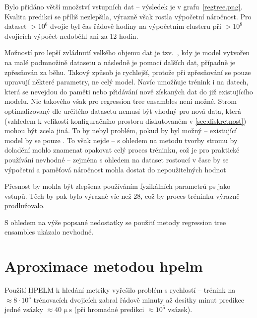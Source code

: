 Bylo přidáno větší množství vstupních dat -- výsledek je v grafu~\ref{regtree.png}. Kvalita predikcí se příliš nezlepšila, výrazně však rostla výpočetní 
náročnost. Pro dataset $>10^6$ dvojic byl čas řádově hodiny na výpočetním clusteru při $>10^8$ dvojicích výpočet 
nedoběhl ani za 12 hodin. 
% 
% 


Možností pro lepší zvládnutí velkého objemu dat je tzv.~, kdy je model vytvořen na malé podmnožině datasetu a následně je 
pomocí dalších dat, případně je zpřesňován za běhu. Takový způsob je rychlejší, protože při zpřesňování se pouze upravují některé parametry, ne 
celý model. Navíc umožňuje trénink i na datech, která se nevejdou do paměti nebo přidávání nově získaných dat do již existujícího modelu. 
Nic takového však pro regression tree ensambles není možné. 
Strom optimalizovaný dle určitého datasetu nemusí být vhodný pro nová data, která (vzhledem k velikosti 
konfiguračního prostoru diskutovaném v \ref{sec:diskretnost}) mohou být zcela jiná. To by nebyl problém, pokud by  byl možný -- existující 
model by se pouze . To však nejde -- s ohledem na metodu tvorby stromu by doladění mohlo znamenat opakovat celý proces tréninku, což 
je pro praktické používání nevhodné -- zejména s ohledem na dataset rostoucí v čase by se výpočetní a paměťová náročnost mohla dostat do nepoužitelných 
hodnot

Přesnost by mohla být zlepšena používáním fyzikálních parametrů \ac{ps} jako vstupů. Těch by pak bylo výrazně víc než 28, což by proces tréninku 
výrazně prodlužovalo. 

S ohledem na výše popsané nedostatky se použití metody regression tree ensambles ukázalo nevhodné.

\section{Aproximace metodou \acs{hpelm}}
Použití HPELM k hledání metriky vyřešilo problém s rychlostí -- trénink na $\approx 8\cdot10^5$ trénovacích dvojicích 
zabral řádově minuty až desítky minut predikce jedné vsázky $\approx 40 \mathrm{\upmu s}$ (při hromadné predikci $\approx 10^5$ vsázek).

